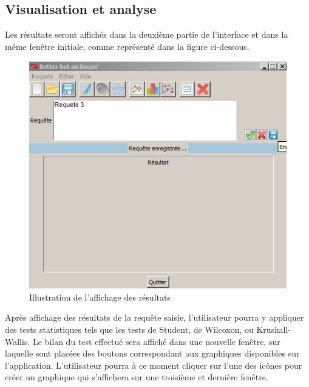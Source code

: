 \documentclass[a4paper,10pt]{report}
\begin{document}
\subsection{Visualisation et analyse}

Les résultats seront affichés dans la deuxième partie de l'interface et dans la même fenêtre initiale, comme représenté dans la figure ci-dessous.


\begin{figure}[H]

\centering
\includegraphics[scale=0.6]{res.jpg}
\caption{Illustration de l'affichage des résultats}

\end{figure}

Après affichage des résultats de la requête saisie, l'utilisateur pourra y appliquer des tests statistiques tels que les tests de Student, de Wilcoxon, ou Kruskall-Wallis. Le bilan du test effectué sera affiché dans une nouvelle fenêtre, sur laquelle sont placées des boutons correspondant aux graphiques disponibles sur l'application. L'utilisateur pourra à ce moment cliquer sur l'une des icônes pour créer un graphique qui s'affichera sur une troisième et dernière fenêtre.
\end{document}
